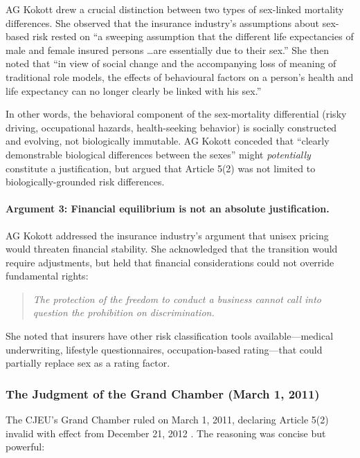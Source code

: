 \documentclass[12pt,a4paper]{article}
\begin{document}
AG Kokott drew a crucial distinction between two types of sex-linked mortality differences. She observed that the insurance industry's assumptions about sex-based risk rested on ``a sweeping assumption that the different life expectancies of male and female insured persons \ldots are essentially due to their sex.'' She then noted that ``in view of social change and the accompanying loss of meaning of traditional role models, the effects of behavioural factors on a person's health and life expectancy can no longer clearly be linked with his sex.''

In other words, the behavioral component of the sex-mortality differential (risky driving, occupational hazards, health-seeking behavior) is socially constructed and evolving, not biologically immutable. AG Kokott conceded that ``clearly demonstrable biological differences between the sexes'' might \emph{potentially} constitute a justification, but argued that Article 5(2) was not limited to biologically-grounded risk differences.

\paragraph{Argument 3: Financial equilibrium is not an absolute justification.}

AG Kokott addressed the insurance industry's argument that unisex pricing would threaten financial stability. She acknowledged that the transition would require adjustments, but held that financial considerations could not override fundamental rights:

\begin{quote}
\emph{The protection of the freedom to conduct a business cannot call into question the prohibition on discrimination.}
\end{quote}

She noted that insurers have other risk classification tools available---medical underwriting, lifestyle questionnaires, occupation-based rating---that could partially replace sex as a rating factor.

\subsubsection{The Judgment of the Grand Chamber (March 1, 2011)}

The CJEU's Grand Chamber ruled on March 1, 2011, declaring Article 5(2) invalid with effect from December 21, 2012 \cite{testachats2011}. The reasoning was concise but powerful:
\end{document}
